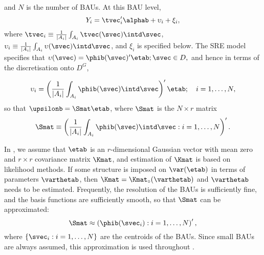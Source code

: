 \noindent and $N$ is the number of BAUs. At this BAU level,
\begin{equation} \label{eq:Yi1}
Y_i = \tvec_i'\alphab + \upsilon_i + \xi_i,
\end{equation}
\noindent where $\tvec_i \equiv \frac{1}{|A_i|}\int_{A_i} \tvec(\svec) \intd \svec$, $\upsilon_i\equiv \frac{1}{|A_i|}\int_{A_i} \upsilon(\svec) \intd \svec$, and $\xi_i$ is specified below. The SRE model specifies that $\upsilon(\svec) = \phib(\svec)'\etab; \svec \in D,$ and hence in terms of the discretisation onto $D^G$,


$$
\upsilon_i = \left(\frac{1}{|A_i|}\int_{A_i}\phib(\svec)\intd \svec\right)' \etab; \quad i = 1,\dots,N,
$$
\noindent so that $\upsilonb = \Smat\etab$, where $\Smat$ is the $N \times r$ matrix
\begin{equation}\label{eq:S}
\Smat \equiv \left(\frac{1}{|A_i|}\int_{A_i}\phib(\svec)\intd\svec : i = 1,\dots,N\right)'.
\end{equation}

In , we assume that $\etab$ is an $r$-dimensional Gaussian vector with mean zero and $r \times r$ covariance matrix $\Kmat$, and estimation of $\Kmat$ is based on likelihood methods. If some structure is imposed on $\var(\etab)$ in terms of parameters $\varthetab$, then $\Kmat = \Kmat_\circ(\varthetab)$ and $\varthetab$ needs to be estimated. Frequently, the resolution of the BAUs is sufficiently fine, and the basis functions are sufficiently smooth, so that $\Smat$ can be approximated:
\begin{equation}\label{eq:Sapprox}
\Smat \approx \left(\phib(\svec_i) : i = 1,\dots,N\right)',
\end{equation}
where $\{\svec_i: i = 1,\dots,N\}$ are the centroids of the BAUs. Since small BAUs are always assumed, this approximation is used throughout .

